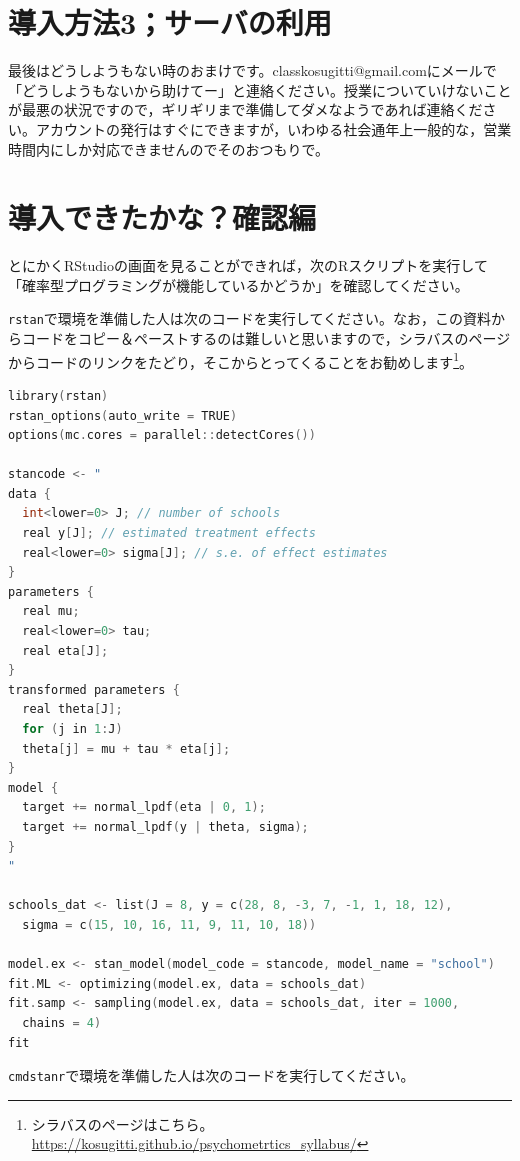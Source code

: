 \documentclass{ltjsbook}
\begin{document}
\section{導入方法3；サーバの利用}

最後はどうしようもない時のおまけです。classkosugitti@gmail.comにメールで「どうしようもないから助けてー」と連絡ください。授業についていけないことが最悪の状況ですので，ギリギリまで準備してダメなようであれば連絡ください。アカウントの発行はすぐにできますが，いわゆる社会通年上一般的な，営業時間内にしか対応できませんのでそのおつもりで。

\section{導入できたかな？確認編}

とにかくRStudioの画面を見ることができれば，次のRスクリプトを実行して「確率型プログラミングが機能しているかどうか」を確認してください。

\texttt{rstan}で環境を準備した人は次のコードを実行してください。なお，この資料からコードをコピー＆ペーストするのは難しいと思いますので，シラバスのページからコードのリンクをたどり，そこからとってくることをお勧めします\footnote{シラバスのページはこちら。\url{https://kosugitti.github.io/psychometrtics_syllabus/}}。


\begin{lstlisting}[language=c++,label={code::App1},caption={rstanパッケージの起動確認}]
library(rstan)
rstan_options(auto_write = TRUE)
options(mc.cores = parallel::detectCores())

stancode <- "
data {
  int<lower=0> J; // number of schools 
  real y[J]; // estimated treatment effects
  real<lower=0> sigma[J]; // s.e. of effect estimates 
}
parameters {
  real mu; 
  real<lower=0> tau;
  real eta[J];
}
transformed parameters {
  real theta[J];
  for (j in 1:J)
  theta[j] = mu + tau * eta[j];
}
model {
  target += normal_lpdf(eta | 0, 1);
  target += normal_lpdf(y | theta, sigma);
}
"

schools_dat <- list(J = 8, y = c(28, 8, -3, 7, -1, 1, 18, 12), 
  sigma = c(15, 10, 16, 11, 9, 11, 10, 18))

model.ex <- stan_model(model_code = stancode, model_name = "school")
fit.ML <- optimizing(model.ex, data = schools_dat)
fit.samp <- sampling(model.ex, data = schools_dat, iter = 1000, 
  chains = 4)
fit
\end{lstlisting}

\texttt{cmdstanr}で環境を準備した人は次のコードを実行してください。
\end{document}
